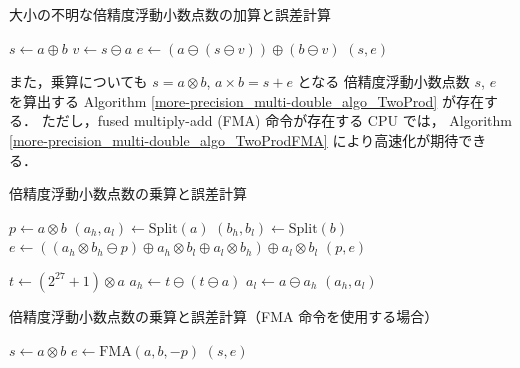 \begin{algorithm}[tp]
    \caption{大小の不明な倍精度浮動小数点数の加算と誤差計算\cite[Algorithm 4]{Hida2001}}
    \label{more-precision_multi-double_algo_TwoSum}
    \begin{algorithmic}[1]
        \State $s \gets a \oplus b$
        \State $v \gets s \ominus a$
        \State $e \gets (a \ominus (s \ominus v)) \oplus (b \ominus v)$
        \State \Return $(s, e)$
        \EndProcedure
    \end{algorithmic}
\end{algorithm}

また，乗算についても
$s = a \otimes b$, $a \times b = s + e$ となる
倍精度浮動小数点数 $s$, $e$ を算出する
Algorithm \ref{more-precision_multi-double_algo_TwoProd} が存在する．
ただし，fused multiply-add (FMA) 命令が存在する CPU では，
Algorithm \ref{more-precision_multi-double_algo_TwoProdFMA} により高速化が期待できる．

\begin{algorithm}[tp]
    \caption{倍精度浮動小数点数の乗算と誤差計算\cite[Algorithm 5, 6]{Hida2001}}
    \label{more-precision_multi-double_algo_TwoProd}
    \begin{algorithmic}[1]
        \State $p \gets a \otimes b$
        \State $(a_h, a_l) \gets \text{Split}(a)$
        \State $(b_h, b_l) \gets \text{Split}(b)$
        \State $e \gets ((a_h \otimes b_h \ominus p) \oplus a_h \otimes b_l \oplus a_l \otimes b_h) \oplus a_l \otimes b_l$
        \State \Return $(p, e)$
        \EndProcedure
    \end{algorithmic}
    \begin{algorithmic}[1]
        \State $t \gets (2^{27} + 1) \otimes a$
        \State $a_h \gets t \ominus (t \ominus a)$
        \State $a_l \gets a \ominus a_h$
        \State \Return $(a_h, a_l)$
        \EndProcedure
    \end{algorithmic}
\end{algorithm}

\begin{algorithm}[tp]
    \caption{倍精度浮動小数点数の乗算と誤差計算（FMA 命令を使用する場合）\cite[Algorithm 7]{Hida2001}}
    \label{more-precision_multi-double_algo_TwoProdFMA}
    \begin{algorithmic}[1]
        \State $s \gets a \otimes b$
        \State $e \gets \text{FMA}(a, b, -p)$
        \State \Return $(s, e)$
        \EndProcedure
    \end{algorithmic}
\end{algorithm}

